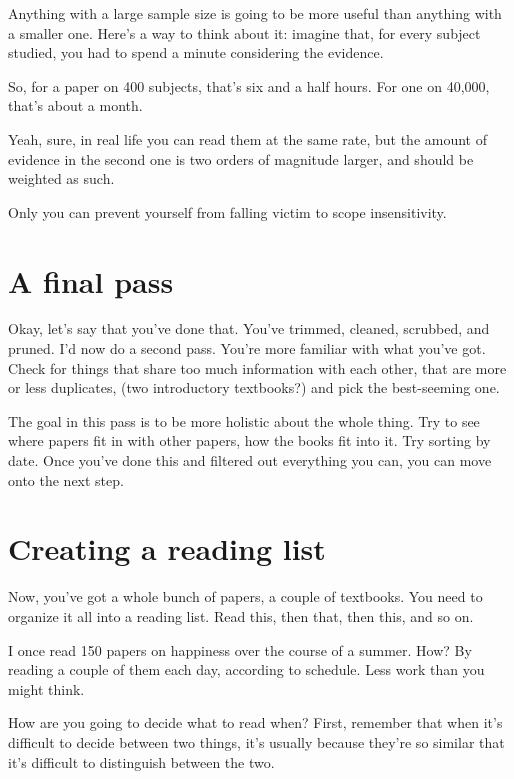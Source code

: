  Anything with a large sample size is going to be more useful
than anything with a smaller one. Here's a way to think about it: imagine that,
for every subject studied, you had to spend a minute considering the evidence.

So, for a paper on 400 subjects, that's six and a half hours. For one on 40,000,
that's about a month.

Yeah, sure, in real life you can read them at the same rate, but the amount of
evidence in the second one is two orders of magnitude larger, and should be
weighted as such.

Only you can prevent yourself from falling victim to scope insensitivity.


\section{A final pass}

Okay, let's say that you've done that. You've trimmed, cleaned, scrubbed, and pruned. I'd now do
a second pass. You're more familiar with what you've got. Check for things that
share too much information with each other, that are more or less duplicates,
(two introductory textbooks?) and pick the best-seeming one.

The goal in this pass is to be more holistic about the whole thing. Try to see
where papers fit in with other papers, how the books fit into it. Try sorting by
date. Once you've done this and filtered out everything you can, you can move
onto the next step.

\section{Creating a reading list}

Now, you've got a whole bunch of papers, a couple of textbooks. You need to
organize it all into a reading list. Read this, then that, then this, and so on.

I once read 150 papers on happiness over the course of a summer. How? By reading
a couple of them each day, according to schedule. Less work than you might
think.

 How are you going to decide what to read when? First, remember that
when it's difficult to decide between two things, it's usually because they're
so similar that it's difficult to distinguish between the two.

